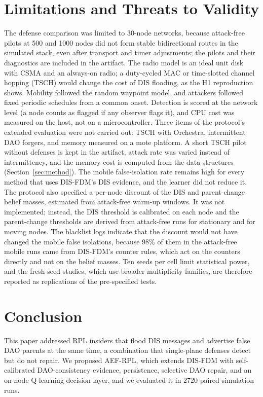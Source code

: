 \section{Limitations and Threats to Validity}\label{sec:limitations}
The defense comparison was limited to 30-node networks, because attack-free pilots at 500 and 1000 nodes did not form stable bidirectional routes in the simulated stack, even after transport and timer adjustments; the pilots and their diagnostics are included in the artifact. The radio model is an ideal unit disk with CSMA and an always-on radio; a duty-cycled MAC or time-slotted channel hopping (TSCH) would change the cost of DIS flooding, as the H1 reproduction shows. Mobility followed the random waypoint model, and attackers followed fixed periodic schedules from a common onset. Detection is scored at the network level (a node counts as flagged if any observer flags it), and CPU cost was measured on the host, not on a microcontroller. Three items of the protocol's extended evaluation were not carried out: TSCH with Orchestra, intermittent DAO forgers, and memory measured on a mote platform. A short TSCH pilot without defenses is kept in the artifact, attack rate was varied instead of intermittency, and the memory cost is computed from the data structures (Section~\ref{sec:method}). The mobile false-isolation rate remains high for every method that uses DIS-FDM's DIS evidence, and the learner did not reduce it. The protocol also specified a per-node discount of the DIS and parent-change belief masses, estimated from attack-free warm-up windows. It was not implemented; instead, the DIS threshold is calibrated on each node and the parent-change thresholds are derived from attack-free runs for stationary and for moving nodes. The blacklist logs indicate that the discount would not have changed the mobile false isolations, because 98\% of them in the attack-free mobile runs came from DIS-FDM's counter rules, which act on the counters directly and not on the belief masses. Ten seeds per cell limit statistical power, and the fresh-seed studies, which use broader multiplicity families, are therefore reported as replications of the pre-specified tests.

\section{Conclusion}\label{sec:conclusion}
This paper addressed RPL insiders that flood DIS messages and advertise false DAO parents at the same time, a combination that single-plane defenses detect but do not repair. We proposed AEF-RPL, which extends DIS-FDM with self-calibrated DAO-consistency evidence, persistence, selective DAO repair, and an on-node Q-learning decision layer, and we evaluated it in 2720 paired simulation runs.

